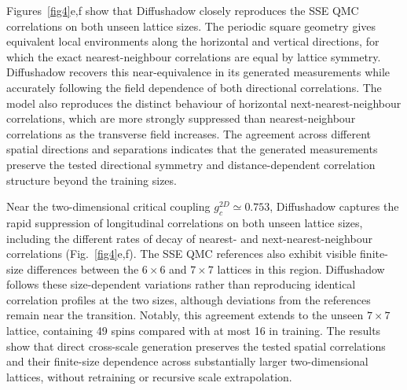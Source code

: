 \documentclass[pdflatex,sn-nature]{sn-jnl}%
\theoremstyle{thmstyleone}%
\theoremstyle{thmstyletwo}%
\theoremstyle{thmstylethree}%
\begin{document}
Figures~\ref{fig4}e,f show that Diffushadow closely reproduces the SSE QMC correlations on both unseen lattice sizes. The periodic square geometry gives equivalent local environments along the horizontal and vertical directions, for which the exact nearest-neighbour correlations are equal by lattice symmetry. Diffushadow recovers this near-equivalence in its generated measurements while accurately following the field dependence of both directional correlations. The model also reproduces the distinct behaviour of horizontal next-nearest-neighbour correlations, which are more strongly suppressed than nearest-neighbour correlations as the transverse field increases. The agreement across different spatial directions and separations indicates that the generated measurements preserve the tested directional symmetry and distance-dependent correlation structure beyond the training sizes.

Near the two-dimensional critical coupling $g_c^{2D}\simeq0.753$, Diffushadow captures the rapid suppression of longitudinal correlations on both unseen lattice sizes, including the different rates of decay of nearest- and next-nearest-neighbour correlations (Fig.~\ref{fig4}e,f). The SSE QMC references also exhibit visible finite-size differences between the $6\times6$ and $7\times7$ lattices in this region. Diffushadow follows these size-dependent variations rather than reproducing identical correlation profiles at the two sizes, although deviations from the references remain near the transition. Notably, this agreement extends to the unseen $7\times7$ lattice, containing 49 spins compared with at most 16 in training. The results show that direct cross-scale generation preserves the tested spatial correlations and their finite-size dependence across substantially larger two-dimensional lattices, without retraining or recursive scale extrapolation.
\end{document}
